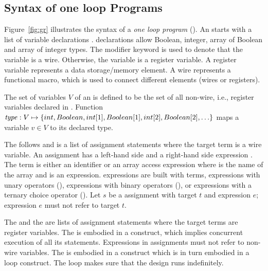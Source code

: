 \subsection{Syntax of one loop Programs}
%

Figure~\ref{fig:gr} illustrates the syntax of a 
{\em one loop program} (\caig).
An \caig starts with 
a list of variable declarations . 
\caig declarations allow Boolean, integer, array of Boolean 
and array of integer types.
The  modifier keyword is used to denote that 
the variable is a wire. 
Otherwise, the variable is a register variable. 
A register variable represents a data storage/memory element. A wire represents a functional macro, which is used 
to connect different elements (wires or registers).


\begin{definition}
The set of variables $V$ of an \caig is defined to be 
the set of all non-wire, i.e., register variables declared in .
Function $\mathit{type}: V \mapsto \{ int, Boolean, int[1], Boolean[1], int[2], Boolean[2], \ldots \}$ maps a variable
$v \in V$ to its declared type. 
\end{definition}


The  follows  and is a list 
of assignment statements where the target term is a wire 
variable. 
An assignment has a left-hand side  and 
a right-hand side expression . 
The term is either an identifier  or an array 
access expression  where  is the name
of the array and  is an expression. 
\caig expressions are built with terms, expressions with unary
operators (\cci{-,!}), expressions with binary operators (\cci{+,-,*,/,<,>,<=,>=,==,\&\&,||}), 
or expressions with a ternary choice operator 
(). 
Let $s$ be a  assignment with target $t$ and 
expression $e$; expression $e$ must not refer to target $t$. 



The  and the  are lists 
of assignment statements where the target terms are register variables.
The  is embodied in a  
construct, which implies concurrent execution of all its statements. 
Expressions in  assignments 
must not refer to non-wire
variables. 
The  is embodied in a  construct
which is in turn embodied in a  loop construct. 
The loop makes sure that the design runs indefinitely.



